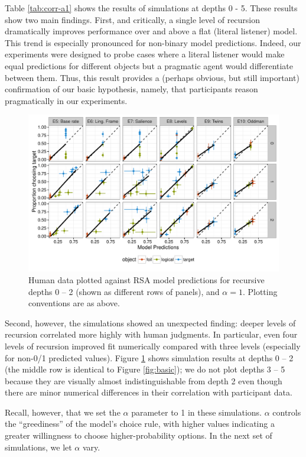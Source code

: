 \documentclass[man]{apa6}
\begin{document}
Table \ref{tab:corr-a1} shows the results of simulations at depths 0 - 5. These results show two main findings. First, and critically, a single level of recursion dramatically improves performance over and above a flat (literal listener) model. This trend is especially pronounced for non-binary model predictions. Indeed, our experiments were designed to probe cases where a literal listener would make equal predictions for different objects but a pragmatic agent would differentiate between them. Thus, this result provides a (perhaps obvious, but still important) confirmation of our basic hypothesis, namely, that participants reason pragmatically in our experiments.

\begin{figure}[t]
 \centering
 \includegraphics[width=6in]{../plots/model_depth.pdf}
 \caption{\label{fig:depths} Human data plotted against RSA model predictions for recursive depths 0 -- 2 (shown as different rows of panels), and $\alpha=1$. Plotting conventions are as above.}
\end{figure}

Second, however, the simulations showed an unexpected finding: deeper levels of recursion correlated more highly with human judgments. In particular, even four levels of recursion improved fit numerically compared with three levels (especially for non-0/1 predicted values). Figure \ref{fig:depths} shows simulation results at depths 0 -- 2 (the middle row is identical to Figure \ref{fig:basic}); we do not plot depths 3 -- 5 because they are visually almost indistinguishable from depth 2 even though there are minor numerical differences in their correlation with participant data.

Recall, however, that we set the $\alpha$ parameter to 1 in these simulations. $\alpha$ controls the ``greediness'' of the model's choice rule, with higher values indicating a greater willingness to choose higher-probability options. In the next set of simulations, we let $\alpha$ vary.
\end{document}
